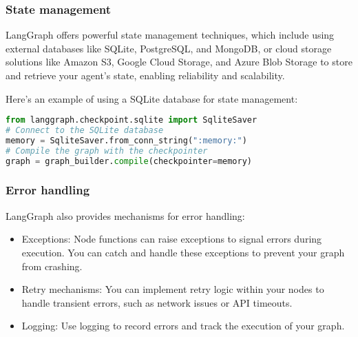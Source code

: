 \begin{frame}[fragile]\frametitle{State management}

LangGraph offers powerful state management techniques, which include using external databases like SQLite, PostgreSQL, and MongoDB, or cloud storage solutions like Amazon S3, Google Cloud Storage, and Azure Blob Storage to store and retrieve your agent's state, enabling reliability and scalability.

Here's an example of using a SQLite database for state management:

      \begin{lstlisting}[language=Python, basicstyle=\tiny]
from langgraph.checkpoint.sqlite import SqliteSaver
# Connect to the SQLite database
memory = SqliteSaver.from_conn_string(":memory:")
# Compile the graph with the checkpointer
graph = graph_builder.compile(checkpointer=memory)
      \end{lstlisting}
\end{frame}


\begin{frame}[fragile]\frametitle{Error handling}
LangGraph also provides mechanisms for error handling:
      \begin{itemize}
        \item Exceptions: Node functions can raise exceptions to signal errors during execution. You can catch and handle these exceptions to prevent your graph from crashing.
        \item Retry mechanisms: You can implement retry logic within your nodes to handle transient errors, such as network issues or API timeouts.
        \item Logging: Use logging to record errors and track the execution of your graph.
      \end{itemize}
\end{frame}



